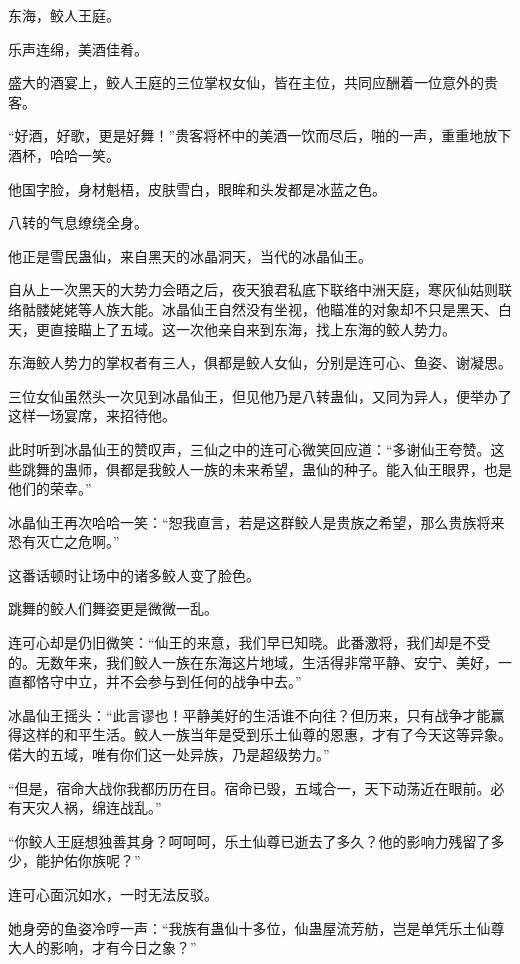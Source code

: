 
\begin{this_body}

东海，鲛人王庭。

乐声连绵，美酒佳肴。

盛大的酒宴上，鲛人王庭的三位掌权女仙，皆在主位，共同应酬着一位意外的贵客。

“好酒，好歌，更是好舞！”贵客将杯中的美酒一饮而尽后，啪的一声，重重地放下酒杯，哈哈一笑。

他国字脸，身材魁梧，皮肤雪白，眼眸和头发都是冰蓝之色。

八转的气息缭绕全身。

他正是雪民蛊仙，来自黑天的冰晶洞天，当代的冰晶仙王。

自从上一次黑天的大势力会晤之后，夜天狼君私底下联络中洲天庭，寒灰仙姑则联络骷髅姥姥等人族大能。冰晶仙王自然没有坐视，他瞄准的对象却不只是黑天、白天，更直接瞄上了五域。这一次他亲自来到东海，找上东海的鲛人势力。

东海鲛人势力的掌权者有三人，俱都是鲛人女仙，分别是连可心、鱼姿、谢凝思。

三位女仙虽然头一次见到冰晶仙王，但见他乃是八转蛊仙，又同为异人，便举办了这样一场宴席，来招待他。

此时听到冰晶仙王的赞叹声，三仙之中的连可心微笑回应道：“多谢仙王夸赞。这些跳舞的蛊师，俱都是我鲛人一族的未来希望，蛊仙的种子。能入仙王眼界，也是他们的荣幸。”

冰晶仙王再次哈哈一笑：“恕我直言，若是这群鲛人是贵族之希望，那么贵族将来恐有灭亡之危啊。”

这番话顿时让场中的诸多鲛人变了脸色。

跳舞的鲛人们舞姿更是微微一乱。

连可心却是仍旧微笑：“仙王的来意，我们早已知晓。此番激将，我们却是不受的。无数年来，我们鲛人一族在东海这片地域，生活得非常平静、安宁、美好，一直都恪守中立，并不会参与到任何的战争中去。”

冰晶仙王摇头：“此言谬也！平静美好的生活谁不向往？但历来，只有战争才能赢得这样的和平生活。鲛人一族当年是受到乐土仙尊的恩惠，才有了今天这等异象。偌大的五域，唯有你们这一处异族，乃是超级势力。”

“但是，宿命大战你我都历历在目。宿命已毁，五域合一，天下动荡近在眼前。必有天灾人祸，绵连战乱。”

“你鲛人王庭想独善其身？呵呵呵，乐土仙尊已逝去了多久？他的影响力残留了多少，能护佑你族呢？”

连可心面沉如水，一时无法反驳。

她身旁的鱼姿冷哼一声：“我族有蛊仙十多位，仙蛊屋流芳舫，岂是单凭乐土仙尊大人的影响，才有今日之象？”


\end{this_body}
